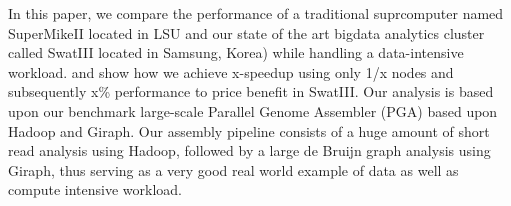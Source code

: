 In this paper, we compare the performance of a traditional suprcomputer named SuperMikeII located in LSU and our state of the art bigdata analytics cluster called SwatIII located in Samsung, Korea) while handling a data-intensive workload. and show how we achieve x-speedup using only 1/x nodes and subsequently x\% performance to price benefit in SwatIII.
Our analysis is based upon our benchmark large-scale Parallel Genome Assembler (PGA) based upon Hadoop and Giraph. 
Our assembly pipeline consists of a huge amount of short read analysis using Hadoop, followed by a large de Bruijn graph analysis using Giraph, thus serving as a very good real world example of data as well as compute intensive workload.
